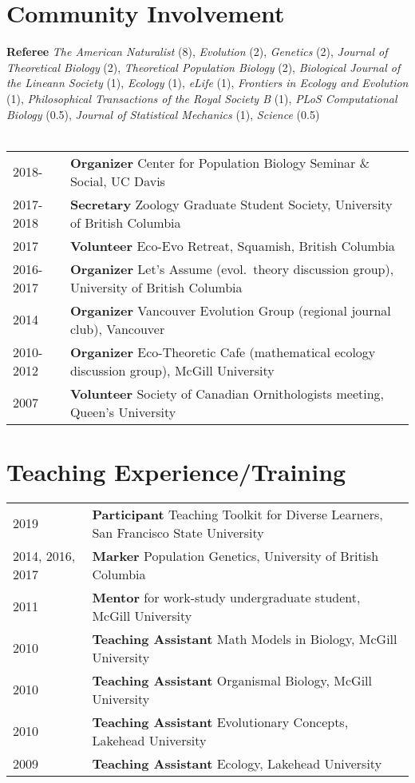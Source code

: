 \documentclass[12pt]{article}
\begin{document}
\section*{Community Involvement}

\noindent \textbf{Referee} \textit{The American Naturalist} (8), \textit{Evolution} (2), \textit{Genetics} (2), \textit{Journal of Theoretical Biology} (2), \textit{Theoretical Population Biology} (2), \textit{Biological Journal of the Lineann Society} (1), \textit{Ecology} (1), \textit{eLife} (1), \textit{Frontiers in Ecology and Evolution} (1), \textit{Philosophical Transactions of the Royal Society B} (1), \textit{PLoS Computational Biology} (0.5), \textit{Journal of Statistical Mechanics} (1), \textit{Science} (0.5) \\\\
\begin{tabular}{ll}
2018- & \textbf{Organizer} Center for Population Biology Seminar \& Social, UC Davis \\
2017-2018 & \textbf{Secretary} Zoology Graduate Student Society, University of British Columbia \\
2017 & \textbf{Volunteer} Eco-Evo Retreat, Squamish, British Columbia \\
2016-2017 & \textbf{Organizer} Let's Assume (evol.\ theory discussion group), University of British Columbia \\
2014 & \textbf{Organizer} Vancouver Evolution Group (regional journal club), Vancouver \\
2010-2012 & \textbf{Organizer} Eco-Theoretic Cafe (mathematical ecology discussion group), McGill University \\
2007 & \textbf{Volunteer} Society of Canadian Ornithologists meeting,  Queen's University
\end{tabular}

\section*{Teaching Experience/Training}

\begin{tabular}{ll}
2019 & \textbf{Participant} Teaching Toolkit for Diverse Learners, San Francisco State University\\ 
2014, 2016, 2017 & \textbf{Marker} Population Genetics, University of British Columbia \\
2011 & \textbf{Mentor} for work-study undergraduate student, McGill University \\
2010 & \textbf{Teaching Assistant} Math Models in Biology, McGill University \\
2010 & \textbf{Teaching Assistant} Organismal Biology, McGill University\\
2010 &  \textbf{Teaching Assistant} Evolutionary Concepts, Lakehead University\\
2009 &  \textbf{Teaching Assistant} Ecology, Lakehead University
\end{tabular}
\end{document}
